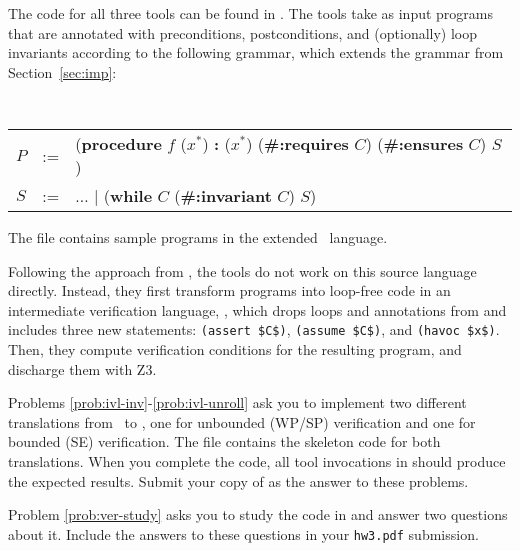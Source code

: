 \documentclass{handout}
\begin{document}
The code for all three tools can be found in . The tools
take as input \imp programs that are annotated with preconditions,
postconditions, and (optionally) loop invariants according to the following
grammar, which extends the grammar from Section~\ref{sec:imp}:

{\tt\small
\begin{tabular}{lcl}
$P$ &:=&  (\textbf{procedure} $f$ ($x^*$) \textbf{:} ($x^*$) (\textbf{\#:requires} $C$)  (\textbf{\#:ensures} $C$) $S$) \\
$S$ &:=&  $\ldots$ $|$  (\textbf{while} $C$ (\textbf{\#:invariant} $C$) $S$) \\
\end{tabular}}

The file  contains sample programs in the extended \imp\
language. 

Following  the approach from , the tools do not work on this source
language directly. Instead, they first transform \imp programs into loop-free
code in an intermediate verification language, \ivl, which drops loops and
annotations from \imp and includes three new statements: \lstinline{(assert $C$)}, 
\lstinline{(assume $C$)}, and \lstinline{(havoc $x$)}. Then, they compute
verification conditions for the resulting program, and discharge them with
Z3.\looseness=-1


Problems \ref{prob:ivl-inv}-\ref{prob:ivl-unroll} ask you to implement two
different translations from \imp\ to \ivl, one for unbounded (WP/SP)
verification and one for bounded (SE) verification. The file 
contains the skeleton code for both translations. When you complete the code,
all tool invocations in \src[imp/]{verified.rkt} should produce the expected
results. Submit your copy of \src[imp/]{ivl.rkt} as the answer to these
problems.

Problem \ref{prob:ver-study} asks you to study the code in 
and answer two questions about it. Include the answers to these questions in
your \texttt{hw3.pdf} submission.
\end{document}
